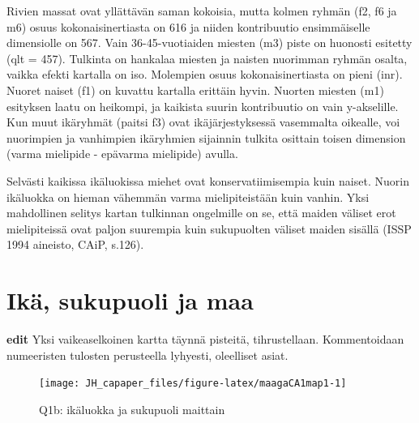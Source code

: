 \documentclass[
  finnish,
]{book}
\newenvironment{Shaded}{\begin{snugshade}}{\end{snugshade}}
\newcommand{\CommentTok}[1]{\textcolor[rgb]{0.56,0.35,0.01}{\textit{#1}}}
\newcommand{\DataTypeTok}[1]{\textcolor[rgb]{0.13,0.29,0.53}{#1}}
\newcommand{\KeywordTok}[1]{\textcolor[rgb]{0.13,0.29,0.53}{\textbf{#1}}}
\newcommand{\NormalTok}[1]{#1}
\newcommand{\StringTok}[1]{\textcolor[rgb]{0.31,0.60,0.02}{#1}}
\begin{document}
Rivien massat ovat yllättävän saman kokoisia, mutta kolmen ryhmän (f2, f6 ja m6)
osuus kokonaisinertiasta on 616 ja niiden kontribuutio ensimmäiselle dimensiolle
on 567. Vain 36-45-vuotiaiden miesten (m3) piste on huonosti esitetty (qlt = 457).
Tulkinta on hankalaa miesten ja naisten nuorimman ryhmän osalta, vaikka efekti
kartalla on iso. Molempien osuus kokonaisinertiasta on pieni (inr). Nuoret naiset
(f1) on kuvattu kartalla erittäin hyvin. Nuorten miesten (m1) esityksen laatu
on heikompi, ja kaikista suurin kontribuutio on vain y-akselille. Kun muut
ikäryhmät (paitsi f3) ovat ikäjärjestyksessä vasemmalta oikealle, voi nuorimpien
ja vanhimpien ikäryhmien sijainnin tulkita osittain toisen dimension (varma
mielipide - epävarma mielipide) avulla.

Selvästi kaikissa ikäluokissa miehet ovat konservatiimisempia kuin naiset.
Nuorin ikäluokka on hieman vähemmän varma mielipiteistään kuin vanhin.
Yksi mahdollinen selitys kartan tulkinnan ongelmille on se, että maiden väliset
erot mielipiteissä ovat paljon suurempia kuin sukupuolten väliset maiden sisällä
(ISSP 1994 aineisto, CAiP, s.126).

\hypertarget{ikuxe4-sukupuoli-ja-maa}{%
\section{Ikä, sukupuoli ja maa}\label{ikuxe4-sukupuoli-ja-maa}}

\textbf{edit} Yksi vaikeaselkoinen kartta täynnä pisteitä, tihrustellaan.
Kommentoidaan numeeristen tulosten perusteella lyhyesti, oleelliset asiat.

\begin{Shaded}
\end{Shaded}

\begin{figure}

{\centering \texttt{[image: JH\_capaper\_files/figure-latex/maagaCA1map1-1]} 

}

\caption{Q1b: ikäluokka ja sukupuoli maittain}\label{fig:maagaCA1map1}
\end{figure}
\end{document}
